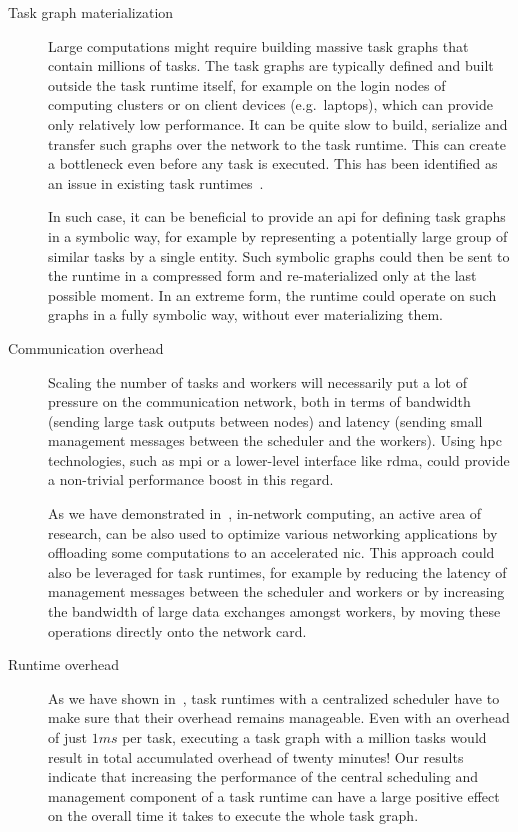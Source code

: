 \begin{description}
	\item[Task graph materialization] Large computations might require building massive task graphs that contain millions of tasks. The
		task graphs are typically defined and built outside the task runtime itself, for example on the
		login nodes of computing clusters or on client devices (e.g.\ laptops), which can provide only
		relatively low performance. It can be quite slow to build, serialize and transfer such graphs over
		the network to the task runtime. This can create a bottleneck even before any task is executed.
		This has been identified as an issue in existing task runtimes~\cite{dask-client-perf}.

		In such case, it can be beneficial to provide an \gls{api} for defining task
		graphs in a symbolic way, for example by representing a potentially large group of similar tasks by
		a single entity. Such symbolic graphs could then be sent to the runtime in a compressed form and
		re-materialized only at the last possible moment. In an extreme form, the runtime could operate on
		such graphs in a fully symbolic way, without ever materializing them.
	\item[Communication overhead] Scaling the number of tasks and workers will necessarily put a lot of pressure on the communication
		network, both in terms of bandwidth (sending large task outputs between nodes) and latency (sending
		small management messages between the scheduler and the workers). Using \gls{hpc}
		technologies, such as \gls{mpi} or a lower-level interface like
		\gls{rdma}, could provide a non-trivial performance boost in this regard.

		As we have demonstrated in~\cite{pspin, spin2}, in-network computing, an active area of
		research, can be also used to optimize various networking applications by offloading some
		computations to an accelerated \gls{nic}. This approach could also be leveraged
		for task runtimes, for example by reducing the latency of management messages between the scheduler
		and workers or by increasing the bandwidth of large data exchanges amongst workers, by moving these
		operations directly onto the network card.
	\item[Runtime overhead] As we have shown in~\cite{rsds}, task runtimes with a centralized scheduler have to
		make sure that their overhead remains manageable. Even with an overhead of just
		$1ms$ per task, executing a task graph with a million tasks would result in
		total accumulated overhead of twenty minutes! Our results indicate that increasing the performance
		of the central scheduling and management component of a task runtime can have a large positive
		effect on the overall time it takes to execute the whole task graph.


\end{description}
